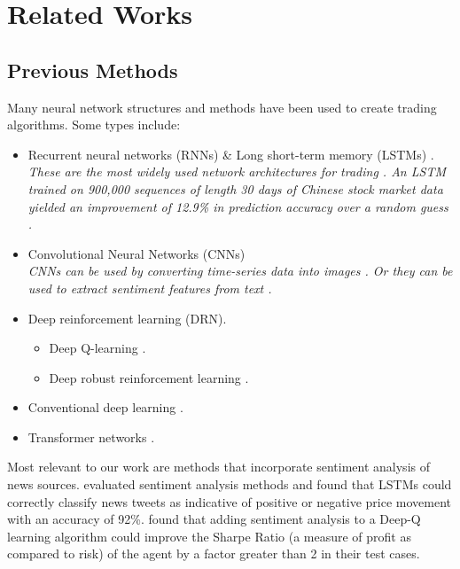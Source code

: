 \documentclass[conference]{IEEEtran}
\begin{document}
\section{Related Works}
\subsection{Previous Methods}
Many neural network structures and methods have been used to create trading algorithms. Some types include: 
\begin{itemize}
	\item Recurrent neural networks (RNNs) \& Long short-term memory (LSTMs) \cite{Chen2017}\cite{Mehta2021}.
	      \\\emph{These are the most widely used network architectures for trading \cite{Gu2020}. An LSTM trained on 900,000 sequences of length 30 days of Chinese stock market data yielded an improvement of 12.9\% in prediction accuracy over a random guess \cite{Chen2015}.}
	\item Convolutional Neural Networks (CNNs) \cite{Gu2020}
	      \\\emph{CNNs can be used by converting time-series data into images \cite{Sezer2018}. Or they can be used to extract sentiment features from text \cite{Shi2020}.}
	\item Deep reinforcement learning (DRN).
	      \begin{itemize}
	      	\item Deep Q-learning \cite{Wang2017} \cite{Nan2020}.
	      	\item Deep robust reinforcement learning \cite{Li2019}.
	      \end{itemize}
	\item Conventional deep learning \cite{Day2016}.
	\item Transformer networks \cite{Schmitz2020}.
\end{itemize}

Most relevant to our work are methods that incorporate sentiment analysis of news sources. \cite{Mehta2021} evaluated sentiment analysis methods and found that LSTMs could correctly classify news tweets as indicative of positive or negative price movement with an accuracy of 92\%. \cite{Nan2020} found that adding sentiment analysis to a Deep-Q learning algorithm could improve the Sharpe Ratio (a measure of profit as compared to risk) of the agent by a factor greater than 2 in their test cases.
\end{document}

